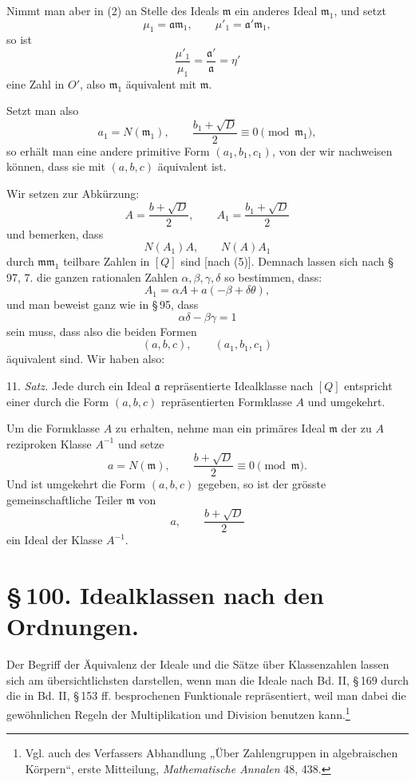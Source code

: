 \documentclass[11pt]{article}
\begin{document}
Nimmt man aber in (2) an Stelle des Ideals $\mathfrak m$ ein anderes Ideal $\mathfrak m_1$, und setzt
\begin{equation}
 \mu_1=\mathfrak a\mathfrak m_1,\qquad
 \mu'_1=\mathfrak a'\mathfrak m_1,
\tag{4}
\end{equation}
so ist
\[
 \frac{\mu'_1}{\mu_1}=\frac{\mathfrak a'}{\mathfrak a}=\eta'
\]
eine Zahl in $O'$, also $\mathfrak m_1$ äquivalent mit $\mathfrak m$.

Setzt man also
\begin{equation}
 a_1=N(\mathfrak m_1),\qquad
 \frac{b_1+\sqrt D}{2}\equiv0\pmod{\mathfrak m_1},
\tag{5}
\end{equation}
so erhält man eine andere primitive Form $(a_1,b_1,c_1)$, von der wir nachweisen können, dass sie mit $(a,b,c)$ äquivalent ist.

Wir setzen zur Abkürzung:
\[
 A=\frac{b+\sqrt D}{2},\qquad
 A_1=\frac{b_1+\sqrt D}{2}
\]
und bemerken, dass
\[
 N(A_1)A,\qquad N(A)A_1
\]
durch $\mathfrak m\mathfrak m_1$ teilbare Zahlen in $[Q]$ sind [nach (5)]. Demnach lassen sich nach \S\,97, 7. die ganzen rationalen Zahlen $\alpha,\beta,\gamma,\delta$ so bestimmen, dass:
\begin{equation}
 A_1=\alpha A+a(-\beta+\delta\theta),
\tag{6}
\end{equation}
und man beweist ganz wie in \S\,95, dass
\[
 \alpha\delta-\beta\gamma=1
\]
sein muss, dass also die beiden Formen
\[
 (a,b,c),\qquad (a_1,b_1,c_1)
\]
äquivalent sind. Wir haben also:

11. \emph{Satz.} Jede durch ein Ideal $\mathfrak a$ repräsentierte Idealklasse nach $[Q]$ entspricht einer durch die Form $(a,b,c)$ repräsentierten Formklasse $A$ und umgekehrt.

Um die Formklasse $A$ zu erhalten, nehme man ein primäres Ideal $\mathfrak m$ der zu $A$ reziproken Klasse $A^{-1}$ und setze
\[
 a=N(\mathfrak m),\qquad
 \frac{b+\sqrt D}{2}\equiv0\pmod{\mathfrak m}.
\]
Und ist umgekehrt die Form $(a,b,c)$ gegeben, so ist der grösste gemeinschaftliche Teiler $\mathfrak m$ von
\[
 a,\qquad \frac{b+\sqrt D}{2}
\]
ein Ideal der Klasse $A^{-1}$.

\section*{\S\,100. Idealklassen nach den Ordnungen.}

Der Begriff der Äquivalenz der Ideale und die Sätze über Klassenzahlen lassen sich am übersichtlichsten darstellen, wenn man die Ideale nach Bd. II, \S\,169 durch die in Bd. II, \S\,153 ff. besprochenen Funktionale repräsentiert, weil man dabei die gewöhnlichen Regeln der Multiplikation und Division benutzen kann.\footnote{Vgl. auch des Verfassers Abhandlung „Über Zahlengruppen in algebraischen Körpern“, erste Mitteilung, \emph{Mathematische Annalen} 48, 438.}
\end{document}

